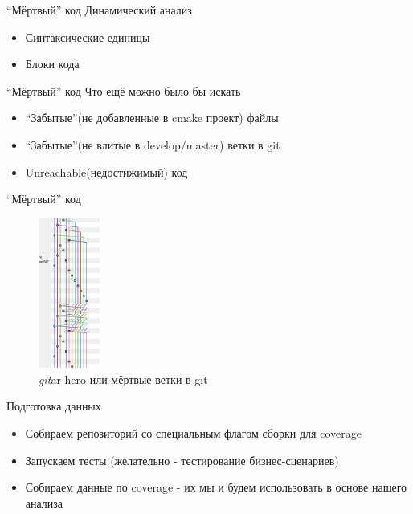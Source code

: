 \documentclass[aspectratio=169]{beamer}
\newcommand{\cmark}{\ding{51}}
\newcommand{\xmark}{\ding{55}}
\begin{document}
\begin{frame}{\enquote{Мёртвый} код}
    Динамический анализ
    \begin{itemize}
        \item[\xmark] Синтаксические единицы
        \item[\cmark] Блоки кода
    \end{itemize}
\end{frame}

\begin{frame}{\enquote{Мёртвый} код}
    Что ещё можно было бы искать
    \begin{itemize}
        \item \enquote{Забытые}(не добавленные в cmake проект) файлы
        \item \enquote{Забытые}(не влитые в develop/master) ветки в git
        \item Unreachable(недостижимый) код
    \end{itemize}
\end{frame}

\begin{frame}{\enquote{Мёртвый} код}
    \begin{figure}
        \includegraphics[width=0.18\textwidth]{memes/git.png}
        \caption{\textit{git}ar hero или мёртвые ветки в git}
    \end{figure}
\end{frame}

\begin{frame}{ Подготовка данных}
    \begin{itemize}
        \item Собираем репозиторий со специальным флагом сборки для coverage
        \item Запускаем тесты (желательно - тестирование бизнес-сценариев)
        \item Собираем данные по coverage - их мы и будем использовать в основе нашего анализа
    \end{itemize}
\end{frame}
\end{document}

